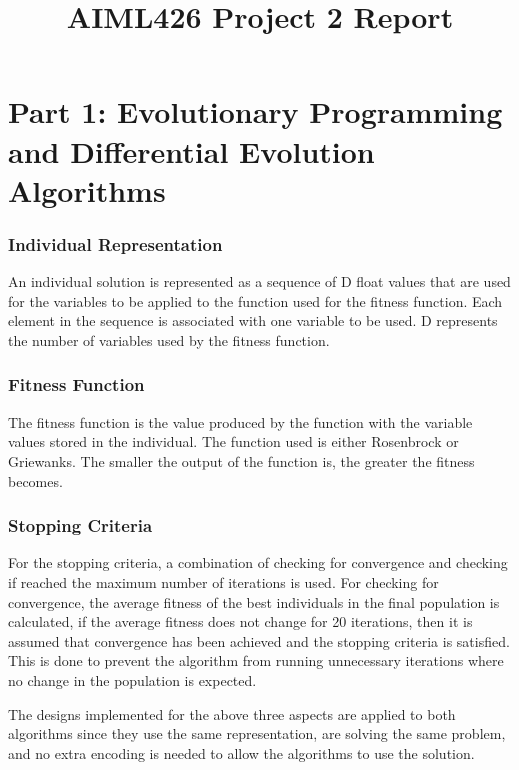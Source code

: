 \documentclass{article}
\title{AIML426 Project 2 Report}
\date{}
\begin{document}
	\maketitle
	
\section*{Part 1: Evolutionary Programming and Differential Evolution Algorithms}
\subsubsection*{Individual Representation}
An individual solution is represented as a sequence of D float values that are used for the variables to be applied to the function used for the fitness function. Each element in the sequence is associated with one variable to be used. D represents the number of variables used by the fitness function. \par
\subsubsection*{Fitness Function}
The fitness function is the value produced by the function with the variable values stored in the individual. The function used is either Rosenbrock or Griewanks. The smaller the output of the function is, the greater the fitness becomes. \par
\subsubsection*{Stopping Criteria}
For the stopping criteria, a combination of checking for convergence and checking if reached the maximum number of iterations is used. For checking for convergence, the average fitness of the best individuals in the final population is calculated, if the average fitness does not change for 20 iterations, then it is assumed that convergence has been achieved and the stopping criteria is satisfied. This is done to prevent the algorithm from running unnecessary iterations where no change in the population is expected. \par

\noindent The designs implemented for the above three aspects are applied to both algorithms since they use the same representation, are solving the same problem, and no extra encoding is needed to allow the algorithms to use the solution. \par
\end{document}
